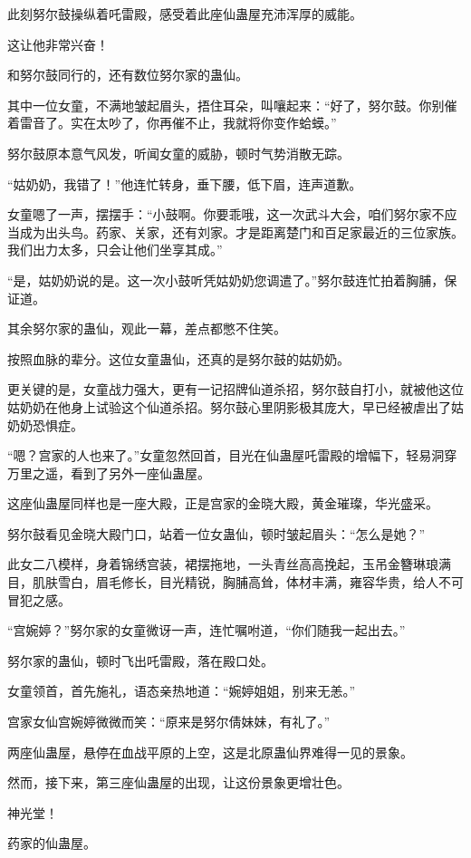 \begin{this_body}
此刻努尔鼓操纵着吒雷殿，感受着此座仙蛊屋充沛浑厚的威能。

这让他非常兴奋！

和努尔鼓同行的，还有数位努尔家的蛊仙。

其中一位女童，不满地皱起眉头，捂住耳朵，叫嚷起来：“好了，努尔鼓。你别催着雷音了。实在太吵了，你再催不止，我就将你变作蛤蟆。”

努尔鼓原本意气风发，听闻女童的威胁，顿时气势消散无踪。

“姑奶奶，我错了！”他连忙转身，垂下腰，低下眉，连声道歉。

女童嗯了一声，摆摆手：“小鼓啊。你要乖哦，这一次武斗大会，咱们努尔家不应当成为出头鸟。药家、关家，还有刘家。才是距离楚门和百足家最近的三位家族。我们出力太多，只会让他们坐享其成。”

“是，姑奶奶说的是。这一次小鼓听凭姑奶奶您调遣了。”努尔鼓连忙拍着胸脯，保证道。

其余努尔家的蛊仙，观此一幕，差点都憋不住笑。

按照血脉的辈分。这位女童蛊仙，还真的是努尔鼓的姑奶奶。

更关键的是，女童战力强大，更有一记招牌仙道杀招，努尔鼓自打小，就被他这位姑奶奶在他身上试验这个仙道杀招。努尔鼓心里阴影极其庞大，早已经被虐出了姑奶奶恐惧症。

“嗯？宫家的人也来了。”女童忽然回首，目光在仙蛊屋吒雷殿的增幅下，轻易洞穿万里之遥，看到了另外一座仙蛊屋。

这座仙蛊屋同样也是一座大殿，正是宫家的金晓大殿，黄金璀璨，华光盛采。

努尔鼓看见金晓大殿门口，站着一位女蛊仙，顿时皱起眉头：“怎么是她？”

此女二八模样，身着锦绣宫装，裙摆拖地，一头青丝高高挽起，玉吊金簪琳琅满目，肌肤雪白，眉毛修长，目光精锐，胸脯高耸，体材丰满，雍容华贵，给人不可冒犯之感。

“宫婉婷？”努尔家的女童微讶一声，连忙嘱咐道，“你们随我一起出去。”

努尔家的蛊仙，顿时飞出吒雷殿，落在殿口处。

女童领首，首先施礼，语态亲热地道：“婉婷姐姐，别来无恙。”

宫家女仙宫婉婷微微而笑：“原来是努尔倩妹妹，有礼了。”

两座仙蛊屋，悬停在血战平原的上空，这是北原蛊仙界难得一见的景象。

然而，接下来，第三座仙蛊屋的出现，让这份景象更增壮色。

神光堂！

药家的仙蛊屋。


\end{this_body}
